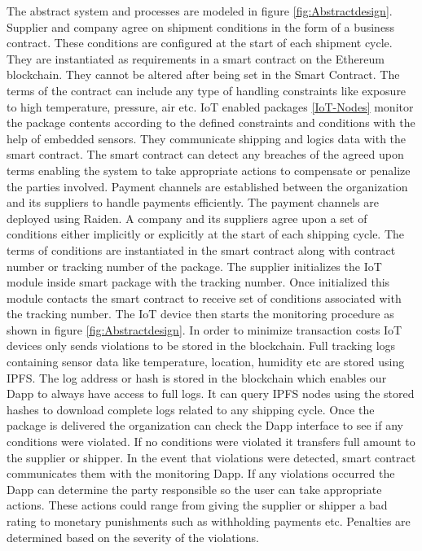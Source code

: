 The abstract system and processes are modeled in figure \ref{fig:Abstractdesign}. Supplier and company agree on shipment conditions in the form of a business contract. These conditions are configured at the start of each shipment cycle. They are instantiated as requirements in a smart contract on the Ethereum blockchain. They cannot be altered after being set in the Smart Contract. The terms of the contract can include any type of handling constraints like exposure to high temperature, pressure, air etc. IoT enabled packages \ref{IoT-Nodes} monitor the package contents according to the defined constraints and conditions with the help of embedded sensors. They communicate shipping and logics data with the smart contract. The smart contract can detect any breaches of the agreed upon terms enabling the system to take appropriate actions to compensate or penalize the parties involved. Payment channels are established between the organization and its suppliers to handle payments efficiently. The payment channels are deployed using Raiden. A company and its suppliers agree upon a set of conditions either implicitly or explicitly at the start of each shipping cycle. The terms of conditions are instantiated in the smart contract along with contract number or tracking number of the package. The supplier initializes the IoT module inside smart package with the tracking number. Once initialized this module contacts the smart contract to receive set of conditions associated with the tracking number. The IoT device then starts the monitoring procedure as shown in figure \ref{fig:Abstractdesign}. In order to minimize transaction costs IoT devices only sends violations to be stored in the blockchain. Full tracking logs containing sensor data like temperature, location, humidity etc are stored using IPFS. The log address or hash is stored in the blockchain which enables our Dapp to always have access to full logs. It can query IPFS nodes using the stored hashes to download complete logs related to any shipping cycle. Once the package is delivered the organization can check the Dapp interface to see if any conditions were violated. If no conditions were violated it transfers full amount to the supplier or shipper. In the event that violations were detected, smart contract communicates them with the monitoring Dapp. If any violations occurred the Dapp can determine the party responsible so the user can take appropriate actions. These actions could range from giving the supplier or shipper a bad rating to monetary punishments such as withholding payments etc. Penalties are determined based on the severity of the violations.

